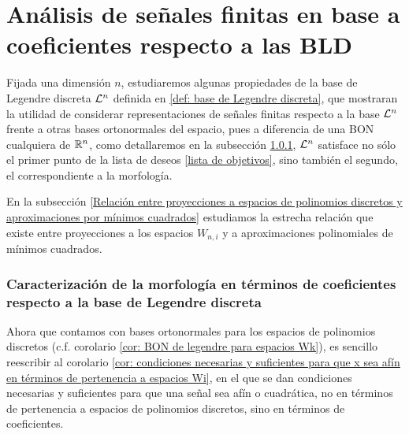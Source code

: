 \chapter{Análisis de señales finitas en base a coeficientes respecto a las BLD}
Fijada una dimensión $n$, estudiaremos algunas propiedades
de la base de Legendre discreta $\mathcal{L}^{n}$ definida en 
\ref{def: base de Legendre discreta}, que mostraran la utilidad
de considerar representaciones de señales finitas
respecto a la base
$\mathcal{L}^{n}$ frente a otras bases ortonormales del espacio, pues
a diferencia de una BON cualquiera de $\mathbb{R}^{n}$, como detallaremos
en la subsección 
\ref{Caracterización de la morfología en términos de coeficientes respecto a la base de Legendre discreta},
$\mathcal{L}^{n}$ satisface no sólo el primer punto
de la lista de deseos
\ref{lista de objetivos}, sino también el segundo, el 
correspondiente a la morfología.

En la subsección 
\ref{Relación entre proyecciones a espacios de polinomios discretos y aproximaciones por mínimos cuadrados}
estudiamos la estrecha relación que existe entre
proyecciones a los espacios $W_{n,i}$ y a aproximaciones
polinomiales de mínimos cuadrados.


\subsection{Caracterización de la morfología en términos de coeficientes respecto a la base de Legendre discreta}
\label{Caracterización de la morfología en términos de coeficientes respecto a la base de Legendre discreta}


Ahora que contamos con bases ortonormales
para los espacios de polinomios discretos
(c.f. corolario \ref{cor: BON de legendre para espacios Wk}),
es sencillo reescribir al corolario
\ref{cor: condiciones necesarias y suficientes para que x sea afín en términos de pertenencia a espacios Wi},
en el que se dan condiciones necesarias y suficientes para que
una señal sea afín o cuadrática,
no en términos de pertenencia a espacios de polinomios
discretos,
sino en términos de coeficientes.



